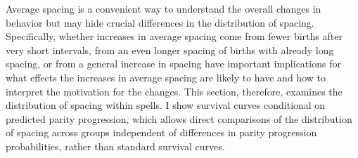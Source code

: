 \documentclass[12pt,letterpaper]{article}
\begin{document}
Average spacing is a convenient way to understand the overall changes in behavior but may 
hide crucial differences in the distribution of spacing.
Specifically, whether increases in average spacing come from fewer births after very short 
intervals, from an even longer spacing of births with already long spacing, or from a 
general increase in spacing have important implications for what effects the increases in 
average spacing are likely to have and how to interpret the motivation for the changes.
This section, therefore, examines the distribution of spacing within spells.
I show survival curves conditional on predicted parity progression, which allows direct 
comparisons of the distribution of spacing across groups independent of differences in 
parity progression probabilities, rather than standard survival curves.


\end{document}
